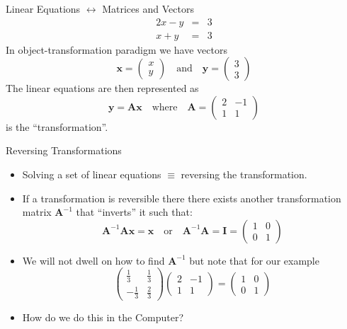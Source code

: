 \documentclass{beamer}
\newcommand{\bx}{\mathbf{x}}
\newcommand{\by}{\mathbf{y}}
\newcommand{\bA}{\mathbf{A}}
\newcommand{\bI}{\mathbf{I}}
\begin{document}
\begin{frame}{Linear Equations $\leftrightarrow$ Matrices and Vectors}
  \begin{eqnarray*}
    2x-y &=& 3 \label{sima}\\
    x+y &=&3 \label{simb}
  \end{eqnarray*}
  In object-transformation paradigm we have vectors
  \begin{equation*}
      \bx = \begin{pmatrix}x\\y\end{pmatrix}\quad\mbox{and}\quad \by = \begin{pmatrix}3\\3\end{pmatrix}
  \end{equation*}
  The linear equations are then represented as
  \begin{equation*}
    \by=\bA\bx\quad\mbox{where}\quad \bA=\begin{pmatrix}2 & -1\\1 &1\end{pmatrix}
  \end{equation*}
  is the ``transformation''.
\end{frame}

\begin{frame}{Reversing Transformations}
  \begin{itemize}
    \item Solving a set of linear equations $\equiv$ reversing the transformation.
    \item If a transformation is reversible there there exists another transformation matrix $\bA^{-1}$ that ``inverts'' it such that:
      \begin{equation*}
        \bA^{-1}\bA\bx = \bx \quad \mbox{or}\quad\bA^{-1}\bA=\bI= \begin{pmatrix}1 & 0 \\0 & 1\end{pmatrix}
      \end{equation*}
      \item We will not dwell on how to find $\bA^{-1}$ but note that for our example
        \begin{equation*}
          \begin{pmatrix}\frac{1}{3}&\frac{1}{3}\\-\frac{1}{3}&\frac{2}{3}\end{pmatrix}\begin{pmatrix}2 & -1\\1 &1\end{pmatrix}=\begin{pmatrix}1 & 0\\0 &1\end{pmatrix}
        \end{equation*}
      \item How do we do this in the Computer?
  \end{itemize}
\end{frame}
\end{document}
